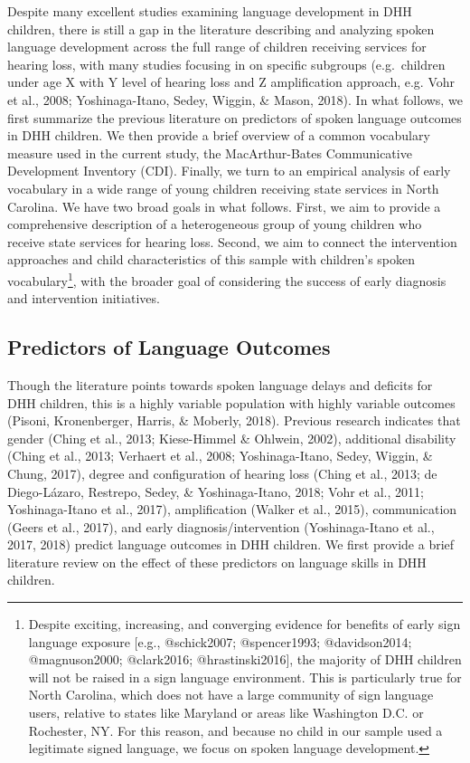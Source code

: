 \documentclass[english,man]{apa6}
\begin{document}
Despite many excellent studies examining language development in DHH children, there is still a gap in the literature describing and analyzing spoken language development across the full range of children receiving services for hearing loss, with many studies focusing in on specific subgroups (e.g.~children under age X with Y level of hearing loss and Z amplification approach, e.g. Vohr et al., 2008; Yoshinaga-Itano, Sedey, Wiggin, \& Mason, 2018). In what follows, we first summarize the previous literature on predictors of spoken language outcomes in DHH children. We then provide a brief overview of a common vocabulary measure used in the current study, the MacArthur-Bates Communicative Development Inventory (CDI). Finally, we turn to an empirical analysis of early vocabulary in a wide range of young children receiving state services in North Carolina. We have two broad goals in what follows. First, we aim to provide a comprehensive description of a heterogeneous group of young children who receive state services for hearing loss. Second, we aim to connect the intervention approaches and child characteristics of this sample with children's spoken vocabulary\footnote{Despite exciting, increasing, and converging evidence for benefits of early sign language exposure [e.g., @schick2007; @spencer1993; @davidson2014; @magnuson2000; @clark2016; @hrastinski2016], the majority of DHH children will not be raised in a sign language environment. This is particularly true for North Carolina, which does not have a large community of sign language users, relative to states like Maryland or areas like Washington D.C. or Rochester, NY. For this reason, and because no child in our sample used a legitimate signed language, we focus on spoken language development.}, with the broader goal of considering the success of early diagnosis and intervention initiatives.

\hypertarget{predictors-of-language-outcomes}{%
\subsection{Predictors of Language Outcomes}\label{predictors-of-language-outcomes}}

Though the literature points towards spoken language delays and deficits for DHH children, this is a highly variable population with highly variable outcomes (Pisoni, Kronenberger, Harris, \& Moberly, 2018). Previous research indicates that gender (Ching et al., 2013; Kiese-Himmel \& Ohlwein, 2002), additional disability (Ching et al., 2013; Verhaert et al., 2008; Yoshinaga-Itano, Sedey, Wiggin, \& Chung, 2017), degree and configuration of hearing loss (Ching et al., 2013; de Diego-Lázaro, Restrepo, Sedey, \& Yoshinaga-Itano, 2018; Vohr et al., 2011; Yoshinaga-Itano et al., 2017), amplification (Walker et al., 2015), communication (Geers et al., 2017), and early diagnosis/intervention (Yoshinaga-Itano et al., 2017, 2018) predict language outcomes in DHH children. We first provide a brief literature review on the effect of these predictors on language skills in DHH children.
\end{document}
